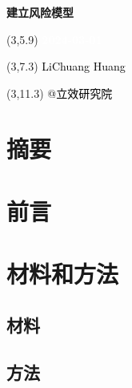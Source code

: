 \documentclass[
]{article}
\author{}
\date{\vspace{-2.5em}}
\begin{document}
\begin{titlepage} 
\begin{center} \textbf{\Huge 建立风险模型}
\vspace{4em} \begin{textblock}{10}(3,5.9) \huge
\textbf{\textcolor{white}{2024-03-01}}
\end{textblock} \begin{textblock}{10}(3,7.3)
\Large \textcolor{black}{LiChuang Huang}
\end{textblock} \begin{textblock}{10}(3,11.3)
\Large \textcolor{black}{@立效研究院}
\end{textblock} \end{center} \end{titlepage}
\restoregeometry


\tableofcontents

\listoffigures

\listoftables

\newpage


\hypertarget{abstract}{%
\section{摘要}\label{abstract}}

\hypertarget{introduction}{%
\section{前言}\label{introduction}}

\hypertarget{methods}{%
\section{材料和方法}\label{methods}}

\hypertarget{ux6750ux6599}{%
\subsection{材料}\label{ux6750ux6599}}

\hypertarget{ux65b9ux6cd5}{%
\subsection{方法}\label{ux65b9ux6cd5}}
\end{document}
